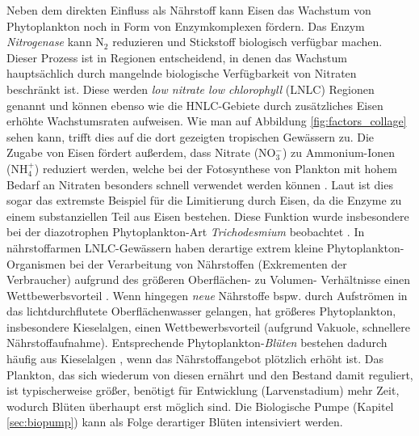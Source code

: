 \documentclass[12pt,a4paper,onecolumn,headheight=30pt]{scrartcl}
\begin{document}
Neben dem direkten Einfluss als Nährstoff kann Eisen das Wachstum von Phytoplankton noch in Form von Enzymkomplexen fördern. Das Enzym \textit{Nitrogenase} kann N$_2$ reduzieren und Stickstoff biologisch verfügbar machen. Dieser Prozess ist in Regionen entscheidend, in denen das Wachstum hauptsächlich durch mangelnde biologische Verfügbarkeit von Nitraten beschränkt ist. Diese werden \textit{low nitrate low chlorophyll} (LNLC) Regionen genannt und können ebenso wie die HNLC-Gebiete durch zusätzliches Eisen erhöhte Wachstumsraten aufweisen. Wie man auf Abbildung \ref{fig:factors_collage} sehen kann, trifft dies auf die dort gezeigten tropischen Gewässern zu. Die Zugabe von Eisen fördert außerdem, dass Nitrate (NO$_3^-$) zu Ammonium-Ionen (NH$_4^+$) reduziert werden, welche bei der Fotosynthese von Plankton mit hohem Bedarf an Nitraten besonders schnell verwendet werden können \citep{Emerson.2009}. Laut \citet{Emerson.2009} ist dies sogar das extremste Beispiel für die Limitierung durch Eisen, da die Enzyme zu einem substanziellen Teil aus Eisen bestehen. Diese Funktion wurde insbesondere bei der diazotrophen Phytoplankton-Art \textit{Trichodesmium} beobachtet \citep{Falkowski.1998}. In nährstoffarmen LNLC-Gewässern haben derartige extrem kleine Phytoplankton-Organismen bei der Verarbeitung von Nährstoffen (Exkrementen der Verbraucher) aufgrund des größeren Oberflächen- zu Volumen- Verhältnisse einen Wettbewerbsvorteil \citep{Falkowski.1998}. Wenn hingegen \textit{neue} Nährstoffe bspw. durch Aufströmen in das lichtdurchflutete Oberflächenwasser gelangen, hat größeres Phytoplankton, insbesondere Kieselalgen, einen Wettbewerbsvorteil (aufgrund Vakuole, schnellere Nährstoffaufnahme). Entsprechende Phytoplankton-\textit{Blüten} bestehen dadurch häufig aus Kieselalgen \citep{Boyd.2007}, wenn das Nährstoffangebot plötzlich erhöht ist. Das Plankton, das sich wiederum von diesen ernährt und den Bestand damit reguliert, ist typischerweise größer, benötigt für Entwicklung (Larvenstadium) mehr Zeit, wodurch Blüten überhaupt erst möglich sind. Die Biologische Pumpe (Kapitel \ref{sec:biopump}) kann als Folge derartiger Blüten intensiviert werden. 
\end{document}
